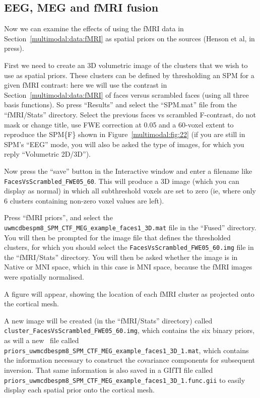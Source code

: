 \subsection{EEG, MEG and fMRI fusion \label{multimodal:fusion:fmri}}

Now we can examine the effects of using the fMRI data in Section~\ref{multimodal:data:fMRI} as spatial priors on the sources (Henson et al, in press).

First we need to create an 3D volumetric image of the clusters that we wish to use as spatial priors. These clusters can be defined by thresholding an SPM for a given fMRI contrast: here we will use the contrast in Section~\ref{multimodal:data:fMRI} of faces versus scrambled faces (using all three basis functions). So press ``Results'' and select the ``SPM.mat'' file from the ``fMRI/Stats'' directory. Select the previous faces vs scrambled F-contrast, do not mask or change title, use FWE correction at 0.05 and a 60-voxel extent to reproduce the SPM\{F\} shown in Figure~\ref{multimodal:fig:22} (if you are still in SPM's ``EEG'' mode, you will also be asked the type of images, for which you reply ``Volumetric 2D/3D'').

Now press the ``save'' button in the Interactive window and enter a filename like \texttt{Faces\-Vs\-Scrambled\_FWE05\_60}. This will produce a 3D image (which you can display as normal) in which all subthreshold voxels are set to zero (ie, where only 6 clusters containing non-zero voxel values are left).

Press ``fMRI priors'', and select the \texttt{uwmcdbespm8\_\-SPM\_\-CTF\_\-MEG\_\-example\_\-faces1\_\-3D.mat} file in the ``Fused'' directory. You will then be prompted for the image file that defines the thresholded clusters, for which you should select the \texttt{FacesVsScrambled\_\-FWE05\_\-60.img} file in the ``fMRI/Stats'' directory.
You will then be asked whether the image is in Native or MNI space, which in this case is MNI space, because the fMRI images were spatially normalised.

A figure will appear, showing the location of each fMRI cluster as projected onto the cortical mesh.

A new image will be created (in the ``fMRI/Stats'' directory) called \texttt{cluster\_\-FacesVsScrambled\_\-FWE05\_\-60.img}, which contains the six binary priors, as will a new \matlab\ file called \texttt{priors\_\-uwmcdbespm8\_\-SPM\_\-CTF\_\-MEG\_\-example\_\-faces1\_\-3D\_\-1.mat}, which contains the information necessary to construct the covariance components for subsequent inversion. That same information is also saved in a GIfTI file called \texttt{priors\_\-uwmcdbespm8\_\-SPM\_\-CTF\_\-MEG\_\-example\_\-faces1\_\-3D\_\-1.func.gii} to easily display each spatial prior onto the cortical mesh.

